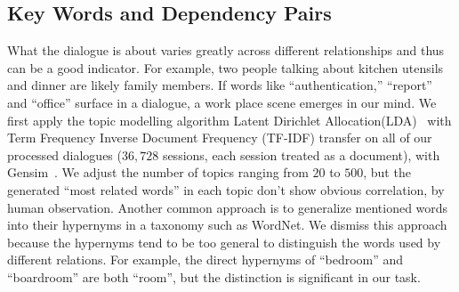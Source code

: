 \subsection*{Key Words and Dependency Pairs} 
What the dialogue is about varies greatly across different 
relationships and thus can be a good indicator. For example, 
two people talking about kitchen utensils and dinner are likely 
family members. If words like ``authentication,'' ``report'' 
and ``office'' surface in a dialogue, 
a work place scene emerges in our mind. 
We first apply the topic modelling algorithm 
Latent Dirichlet Allocation(LDA)~\cite{LDA} with 
Term Frequency Inverse Document Frequency (TF-IDF) 
transfer on all of our processed dialogues ($36,728$ sessions, 
each session treated as a document), with Gensim~\cite{gensim}.
We adjust the number of topics ranging from $20$ to $500$, 
but the generated ``most related words'' in each topic don't
show obvious correlation, by human observation.
Another common approach is to generalize mentioned words into
their hypernyms in a taxonomy such as WordNet. 
We dismiss this approach because the hypernyms tend to be
too general to distinguish the words used by different relations.
For example, the direct hypernyms of ``bedroom'' and ``boardroom'' 
are both ``room'', but the distinction is significant in our task.
